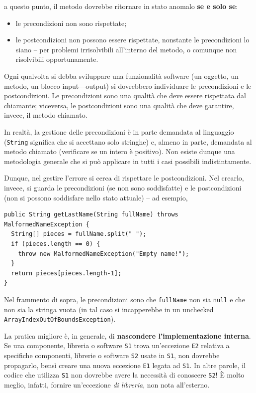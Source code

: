 \documentclass[\fontsizeclass,twocolumn]{\classname}
\theoremstyle{definition}
\theoremstyle{definition}
\begin{document}
a questo punto, il metodo dovrebbe ritornare in stato anomalo \textbf{se e solo se}:
\begin{itemize}
    \item le precondizioni non sono rispettate;
    \item le postcondizioni non possono essere rispettate, nonstante le
        precondizioni lo siano -- per problemi irrisolvibili all'interno del
        metodo, o comunque non risolvibili opportunamente.
\end{itemize}

Ogni qualvolta si debba sviluppare una funzionalità software (un oggetto, un
metodo, un blocco input---output) si dovrebbero individuare le precondizioni e
le postcondizioni. Le precondizioni sono una qualità che deve essere rispettata
dal chiamante; viceversa, le postcondizioni sono una qualità che deve
garantire, invece, il metodo chiamato.

In realtà, la gestione delle precondizioni è in parte demandata al linguaggio
(\texttt{String} significa che si accettano solo stringhe) e, almeno in parte,
demandata al metodo chiamato (verificare se un intero è positivo). Non esiste
dunque una metodologia generale che si può applicare in tutti i casi possibili
indistintamente.

Dunque, nel gestire l'errore si cerca di rispettare le postcondizioni. Nel
crearlo, invece, si guarda le precondizioni (se non sono soddisfatte) e le
postcondizioni (non si possono soddisfare nello stato attuale) -- ad esempio,

\begin{lstlisting}
public String getLastName(String fullName) throws MalformedNameException {
  String[] pieces = fullName.split(" ");
  if (pieces.length == 0) {
    throw new MalformedNameException("Empty name!");
  }
  return pieces[pieces.length-1];
}
\end{lstlisting}

Nel frammento di sopra, le precondizioni sono che \texttt{fullName} non sia
\texttt{null} e che non sia la stringa vuota (in tal caso si incapperebbe in un
unchecked \texttt{ArrayIndexOutOf\-BoundsException}).

La pratica migliore è, in generale, di \textbf{nascondere l'implementazione
interna}. Se una componente, libreria o software \texttt{S1} trova un'eccezione
\texttt{E2} relativa a specifiche componenti, librerie o software \texttt{S2}
usate in \texttt{S1}, non dovrebbe propagarlo, bensì creare una nuova eccezione
\texttt{E1} legata ad \texttt{S1}. In altre parole, il codice che utilizza
\texttt{S1} non dovrebbe avere la necessità di conoscere \texttt{S2}! È molto
meglio, infatti, fornire un'eccezione \emph{di libreria}, non nota all'esterno.
\end{document}
